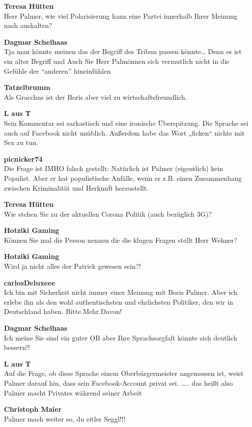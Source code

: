 \documentclass[]{article}
\begin{document}
\textbf{Teresa Hütten}\\
Herr Palmer, wie viel Polarisierung kann eine Partei innerhalb Ihrer
Meinung nach aushalten?

\textbf{Dagmar Schelhaas}\\
Tja man könnte meinen das der Begriff des Tribun passen könnte\ldots{}
Denn es ist ein alter Begriff und Auch Sie Herr Palmönnen sich
vermutlich nicht in die Gefühle der ``anderen'' hineinfühlen

\textbf{Tatzelbrumm}\\
Als Gracchus\cite{gracchus} ist der Boris aber viel zu
wirtschaftsfreundlich.

\textbf{L aus T}\\
Sein Kommentar sei sarkastisch und eine ironische Überspitzung. Die
Sprache sei auch auf Facebook nicht unüblich. Außerdem habe das Wort
„ficken`` nichts mit Sex zu tun.

\textbf{picnicker74}\\
Die Frage ist IMHO falsch gestellt: Natürlich ist Palmer (eigentlich)
kein Populist. Aber er hat populistische Anfälle, wenn er z.B. einen
Zusammenhang zwischen Kriminalität und Herkunft herzustellt.

\textbf{Teresa Hütten}\\
Wie stehen Sie zu der aktuellen Corona Politik (auch bezüglich 3G)?

\textbf{Hotziki Gaming}\\
Können Sie mal die Person nennen die die klugen Fragen stellt Herr
Wehner?

\textbf{Hotziki Gaming}\\
Wird ja nicht alles der Patrick gewesen sein?!

\textbf{carlosDeluxeee}\\
Ich bin mit Sicherheit nicht immer einer Meinung mit Boris Palmer. Aber
ich erlebe ihn als den wohl authentischsten und ehrlichsten Politiker,
den wir in Deutschland haben. Bitte.Mehr.Davon!

\textbf{Dagmar Schelhaas}\\
Ich meine Sie sind ein guter OB aber Ihre Sprachsorgfalt könnte sich
deutlich bessern!!

\textbf{L aus T}\\
Auf die Frage, ob diese Sprache einem Oberbürgermeister angemessen ist,
weist Palmer darauf hin, dass sein Facebook-Account privat sei.
\ldots{}.. das heißt also Palmer macht Privates während seiner Arbeit

\textbf{Christoph Maier}\\
Palmer mach weiter so, du eitler Seggl!!!
\end{document}
